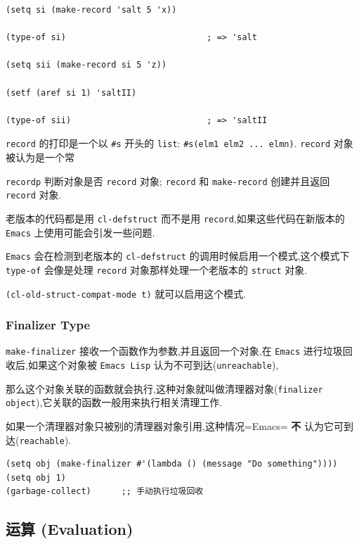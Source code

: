 \documentclass[11pt]{article}
\begin{document}
\begin{verbatim}
(setq si (make-record 'salt 5 'x))

(type-of si)                            ; => 'salt

(setq sii (make-record si 5 'z))

(setf (aref si 1) 'saltII)

(type-of sii)                           ; => 'saltII
\end{verbatim}

\texttt{record} 的打印是一个以 \texttt{\#s} 开头的 \texttt{list}: \texttt{\#s(elm1 elm2 ... elmn)}. \texttt{record} 对象被认为是一个常

\texttt{recordp} 判断对象是否 \texttt{record} 对象; \texttt{record} 和 \texttt{make-record} 创建并且返回 \texttt{record} 对象.

老版本的代码都是用 \texttt{cl-defstruct} 而不是用 \texttt{record},如果这些代码在新版本的 \texttt{Emacs} 上使用可能会引发一些问题.

\texttt{Emacs} 会在检测到老版本的 \texttt{cl-defstruct} 的调用时候启用一个模式,这个模式下 \texttt{type-of} 会像是处理 \texttt{record} 对象那样处理一个老版本的 \texttt{struct} 对象.

\texttt{(cl-old-struct-compat-mode t)} 就可以启用这个模式.


\subsubsection{Finalizer Type}
\label{sec:orgee7b098}

\texttt{make-finalizer} 接收一个函数作为参数,并且返回一个对象,在 \texttt{Emacs} 进行垃圾回收后,如果这个对象被 \texttt{Emacs Lisp} 认为不可到达(\texttt{unreachable}),

那么这个对象关联的函数就会执行,这种对象就叫做清理器对象(\texttt{finalizer object}),它关联的函数一般用来执行相关清理工作.

如果一个清理器对象只被别的清理器对象引用,这种情况=Emacs= \textbf{不} 认为它可到达(\texttt{reachable}).

\begin{verbatim}
(setq obj (make-finalizer #'(lambda () (message "Do something"))))
(setq obj 1)
(garbage-collect)      ;; 手动执行垃圾回收
\end{verbatim}


\subsection{运算 (Evaluation)}
\label{sec:org461fa1d}
\end{document}
